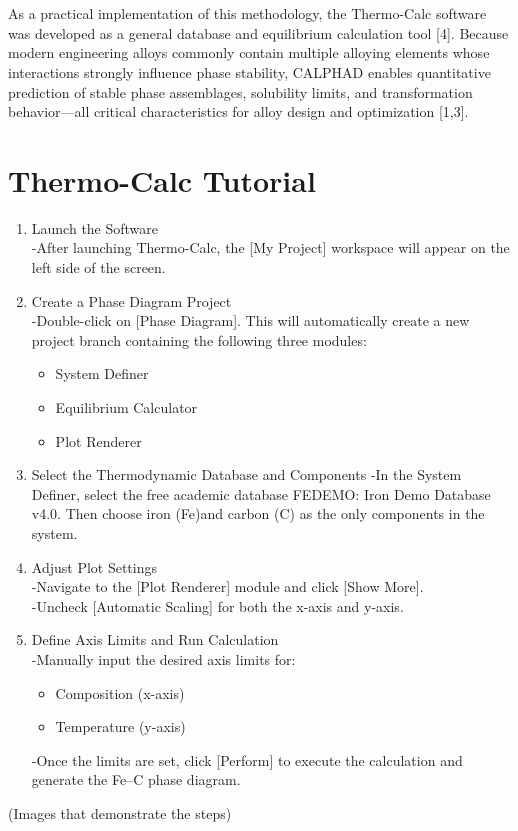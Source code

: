 \documentclass[11pt]{article}
\begin{document}
\\~\\
\noindent As a practical implementation of this methodology, the Thermo-Calc software was developed as a general database and equilibrium calculation tool [4]. Because modern engineering alloys commonly contain multiple alloying elements whose interactions strongly influence phase stability, CALPHAD enables quantitative prediction of stable phase assemblages, solubility limits, and transformation behavior—all critical characteristics for alloy design and optimization [1,3].


\section{Thermo-Calc Tutorial}
\begin{enumerate}
    \item Launch the Software
    \\
    -After launching Thermo-Calc, the [My Project] workspace will appear on the left side of the screen.
    \item Create a Phase Diagram Project 
    \\
    -Double-click on [Phase Diagram]. This will automatically create a new project branch containing the following three modules:
    \begin{itemize}
        \item System Definer
        \item Equilibrium Calculator
        \item Plot Renderer
    \end{itemize}
    \item Select the Thermodynamic Database and Components
    -In the System Definer, select the free academic database FEDEMO: Iron Demo Database v4.0. Then choose iron (Fe)and carbon (C) as the only components in the system.
    \item Adjust Plot Settings
    \\
    -Navigate to the [Plot Renderer] module and click [Show More].
    \\
    -Uncheck [Automatic Scaling] for both the x-axis and y-axis.
    \item Define Axis Limits and Run Calculation
    \\
    -Manually input the desired axis limits for:
    \begin{itemize}
        \item Composition (x-axis)
        \item Temperature (y-axis)
    \end{itemize}
    -Once the limits are set, click [Perform] to execute the calculation and generate the Fe–C phase diagram.

\end{enumerate}
\begin{center}
    (Images that demonstrate the steps)
\end{center}
\end{document}
